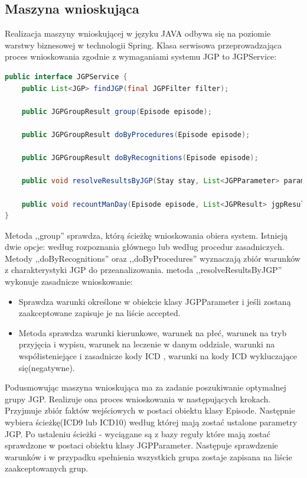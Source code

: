 \subsection{Maszyna wnioskująca}
\label{sec:maszynaWnioskujaca}
Realizacja maszyny wnioskującej w języku JAVA odbywa się na poziomie warstwy biznesowej w technologii Spring. Klasa serwisowa przeprowadzająca proces wnioskowania zgodnie z wymaganiami systemu JGP to JGPService:

\begin{lstlisting}[language=Java]
public interface JGPService {
    public List<JGP> findJGP(final JGPFilter filter);

    public JGPGroupResult group(Episode episode);

    public JGPGroupResult doByProcedures(Episode episode);

    public JGPGroupResult doByRecognitions(Episode episode);

    public void resolveResultsByJGP(Stay stay, List<JGPParameter> parameters, JGPGroupResult jgpGroupResult);

    public void recountManDay(Episode episode, List<JGPResult> jgpResultList);
}
\end{lstlisting}

Metoda ,,group'' sprawdza, którą ścieżkę wnioskowania obiera system. Istnieją dwie opcje: według rozpoznania głównego lub według procedur zasadniczych. Metody ,,doByRecognitions'' oraz ,,doByProcedures'' wyznaczają zbiór warunków z charakterystyki JGP do przeanalizowania. metoda ,,resolveResultsByJGP'' wykonuje zasadnicze wnioskowanie:
\begin{itemize}\itemsep1pt
 \item Sprawdza warunki określone w obiekcie klasy JGPParameter i jeśli zostaną zaakceptowane zapisuje je na liście accepted.
 \item Metoda sprawdza warunki kierunkowe, warunek na płeć, warunek na tryb przyjęcia i wypisu, warunek na leczenie w danym oddziale, warunki na współisteniejące i zasadnicze kody ICD , warunki na kody ICD wykluczające się(negatywne).
\end{itemize}

Podusmowując maszyna wnioskująca ma za zadanie poszukiwanie optymalnej grupy JGP. Realizuje ona proces wnioskowania w następujących krokach. Przyjmuje zbiór faktów wejściowych w postaci obiektu klasy Episode. Następnie wybiera ścieżkę(ICD9 lub ICD10) według której mają zostać ustalone parametry JGP. Po ustaleniu ścieżki - wyciągane są z bazy reguły które mają zostać sprawdzone w postaci obiektu klasy JGPParameter. Następuje sprawdzenie warunków i w przypadku spełnienia wszystkich grupa zostaje zapisana na liście zaakceptowanych grup.


